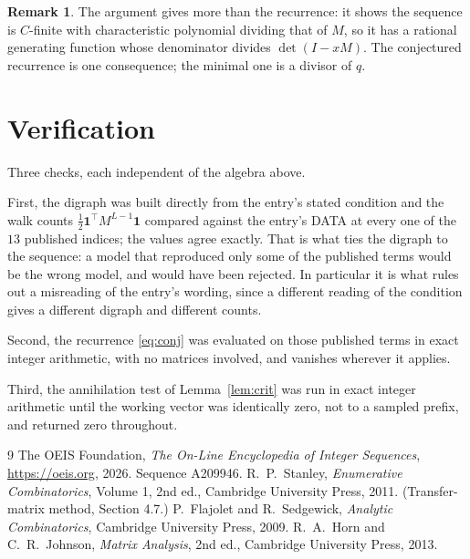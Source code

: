 \documentclass[11pt,a4paper]{article}
\theoremstyle{plain}
\theoremstyle{definition}
\newtheorem{remark}[theorem]{Remark}
\begin{document}
\begin{remark}
The argument gives more than the recurrence: it shows the sequence is $C$-finite with
characteristic polynomial dividing that of $M$, so it has a rational generating function
whose denominator divides $\det(I-xM)$. The conjectured recurrence is one consequence; the
minimal one is a divisor of $q$.
\end{remark}

\section{Verification}

Three checks, each independent of the algebra above.

First, the digraph was built directly from the entry's stated condition and the walk counts
$\tfrac1{2}\mathbf{1}^{\!\top}M^{L-1}\mathbf{1}$ compared against the entry's DATA at
every one of the $13$ published indices; the values agree exactly. That is what ties
the digraph to the sequence: a model that reproduced only some of the published terms would
be the wrong model, and would have been rejected. In particular it is what rules out a
misreading of the entry's wording, since a different reading of the condition gives a
different digraph and different counts.

Second, the recurrence \eqref{eq:conj} was evaluated on those published terms in exact
integer arithmetic, with no matrices involved, and vanishes wherever it applies.

Third, the annihilation test of Lemma~\ref{lem:crit} was run in exact integer arithmetic
until the working vector was identically zero, not to a sampled prefix, and returned zero
throughout.

\begin{thebibliography}{9}
 The OEIS Foundation, \emph{The On-Line Encyclopedia of Integer
Sequences}, \url{https://oeis.org}, 2026. Sequence A209946.
 R.~P.~Stanley, \emph{Enumerative Combinatorics}, Volume 1, 2nd ed.,
Cambridge University Press, 2011. (Transfer-matrix method, Section 4.7.)
 P.~Flajolet and R.~Sedgewick, \emph{Analytic Combinatorics}, Cambridge
University Press, 2009.
 R.~A.~Horn and C.~R.~Johnson, \emph{Matrix Analysis}, 2nd ed., Cambridge
University Press, 2013.
\end{thebibliography}
\end{document}
